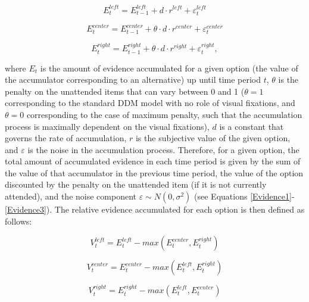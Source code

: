 \documentclass[11pt,a4paper]{article}
\begin{document}
\begin{equation} \label{Evidence1}
E_{t}^{left}=E_{t-1}^{left}+d\cdot r^{left}+\varepsilon_{t}^{left}
\end{equation}

\begin{equation} \label{Evidence2}
E_{t}^{center}=E_{t-1}^{center}+\theta\cdot d\cdot r^{center}+\varepsilon_{t}^{center}
\end{equation}


\begin{equation} \label{Evidence3}
E_{t}^{right}=E_{t-1}^{right}+\theta\cdot d\cdot r^{right}+\varepsilon_{t}^{right},
\end{equation}

where $E_{t}$ is the amount of evidence accumulated for a given option
(the value of the accumulator corresponding to an alternative) up
until time period $t$, $\theta$ is the penalty on the unattended
items that can vary between 0 and 1 ($\theta=1$ corresponding to the standard DDM model with no role of visual fixations, and $\theta=0$ corresponding to the case of maximum penalty, such that the accumulation process is maximally dependent on the visual fixations), $d$ is a constant that governs the rate of accumulation,
$r$ is the subjective value of the given option, and $\varepsilon$ is the noise
in the accumulation process. Therefore, for a given option, the total
amount of accumulated evidence in each time period is given by the
sum of the value of that accumulator in the previous time period,
the value of the option discounted by the penalty on the unattended
item (if it is not currently attended), and the noise component $\varepsilon\sim N(0,\sigma^{2})$ (see Equations \ref{Evidence1}-\ref{Evidence3}). The relative evidence accumulated for each option is then defined as follows:

\begin{equation} \label{REA1}
V_{t}^{left}=E_{t}^{left}-max(E_{t}^{center},E_{t}^{right})
\end{equation}

\begin{equation} \label{REA2}
V_{t}^{center}=E_{t}^{center}-max(E_{t}^{left},E_{t}^{right})
\end{equation}


\begin{equation} \label{REA3}
V_{t}^{right}=E_{t}^{right}-max(E_{t}^{left},E_{t}^{center})
\end{equation}
\end{document}
